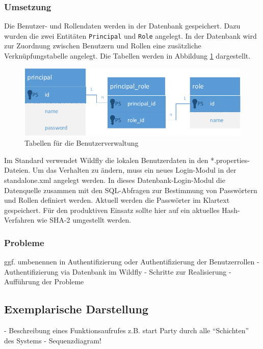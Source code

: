 \subsubsection{Umsetzung}
Die Benutzer- und Rollendaten werden in der Datenbank gespeichert. Dazu wurden die zwei Entitäten \texttt{Principal} und \texttt{Role} angelegt. In der Datenbank wird zur Zuordnung zwischen Benutzern und Rollen eine zusätzliche Verknüpfungstabelle angelegt. Die Tabellen werden in Abbildung \ref{fig:BenutzerRollen} dargestellt.

\begin{figure}[tbh]
\centering
\includegraphics[width=1.0\linewidth]{Bilder/BenutzerRollen}
\caption{Tabellen für die Benutzerverwaltung}
\label{fig:BenutzerRollen}
\end{figure}

Im Standard verwendet Wildfly die lokalen Benutzerdaten in den *.properties-Dateien. Um das Verhalten zu ändern, muss ein neues Login-Modul in der standalone.xml angelegt werden. In dieses Datenbank-Login-Modul die Datenquelle zusammen mit den SQL-Abfragen zur Bestimmung von Passwörtern und Rollen definiert werden. Aktuell werden die Passwörter im Klartext gespeichert. Für den produktiven Einsatz sollte hier auf ein aktuelles Hash-Verfahren wie SHA-2 umgestellt werden.

\subsubsection{Probleme}

ggf. umbenennen in Authentifizierung oder Authentifizierung der Benutzerrollen
- Authentifizierung via Datenbank im Wildfly
- Schritte zur Realisierung
- Aufführung der Probleme


\subsection{Exemplarische Darstellung}
- Beschreibung eines Funktionsaufrufes z.B. start Party durch alle "`Schichten"' des Systems
- Sequenzdiagram!



